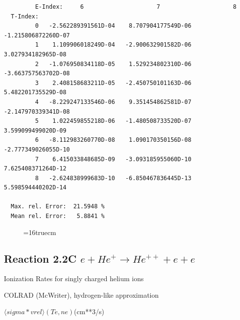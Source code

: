 \documentclass[12pt,dvips]{article}
\begin{document}
\begin{small}
\begin{verbatim}
         E-Index:     6                     7                     8
  T-Index:
         0   -2.562289391561D-04    8.707904177549D-06   -1.215806872260D-07
         1    1.109906018249D-04   -2.900632901582D-06    3.027934182965D-08
         2   -1.076950834118D-05    1.529234802310D-06   -3.663757563702D-08
         3    2.408158683211D-05   -2.450750101163D-06    5.482201735529D-08
         4   -8.229247133546D-06    9.351454862581D-07   -2.147970339341D-08
         5    1.022459855218D-06   -1.480508733520D-07    3.599099499020D-09
         6   -8.112983260770D-08    1.090170350156D-08   -2.777349026055D-10
         7    6.415033848685D-09   -3.093185955060D-10    7.625408371264D-12
         8   -2.624838999683D-10   -6.850467836445D-13    5.598594440202D-14

  Max. rel. Error:  21.5948 %
  Mean rel. Error:   5.8841 %

\end{verbatim}\end{small}
\begin{figure} \label{2.3.13d}
\epsfxsize=16truecm
\end{figure}
\newpage



\subsection{
Reaction 2.2C $e + He^+ \rightarrow He^{++}  + e  + e $
}
  Ionization Rates for singly charged helium ions

  COLRAD (McWriter), hydrogen-like approximation

$  \langle sigma*vrel \rangle(Te,ne) $(cm**3/s)
\end{document}
